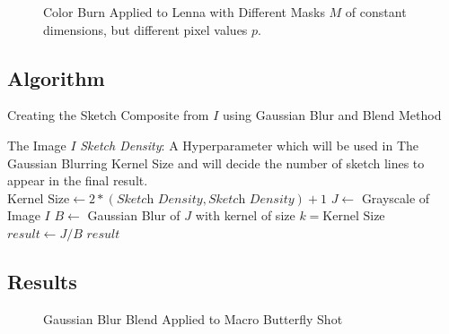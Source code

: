 \documentclass{article}
\begin{document}
\begin{figure}[ht]
    \centering
    \qquad
    \qquad
    \qquad
    \qquad
    \label{fig:lenna-gaussian-blur}%
    \caption{Color Burn Applied to Lenna with Different Masks $M$ of constant dimensions, but different pixel values $p$.}
\end{figure}


\clearpage
\subsection{Algorithm}
\begin{algorithm}
\caption{Creating the Sketch Composite from $I$ using Gaussian Blur and Blend Method}
    \begin{algorithmic}
    \REQUIRE The Image $I$
    \REQUIRE \textit{Sketch Density}: A Hyperparameter which will be used in The Gaussian Blurring Kernel Size and will decide the number of sketch lines to appear in the final result.
    \STATE {}
    \STATE $\text{Kernel Size} \gets 2 * (\textit{Sketch Density}, \textit{Sketch Density}) + 1$
    \STATE $J \gets$ Grayscale of Image $I$
    \STATE $B \gets$ Gaussian Blur of $J$ with kernel of size $k = \text{Kernel Size}$
    \STATE {}
    \STATE {}
    \STATE $result \gets J / B$
    \RETURN $result$
    \end{algorithmic}
\end{algorithm}


\subsection{Results}
\begin{figure}[ht]
    \centering
    \qquad
    \caption{Gaussian Blur Blend Applied to Macro Butterfly Shot \label{fig:blend-butterfly}}
\end{figure}
\end{document}
